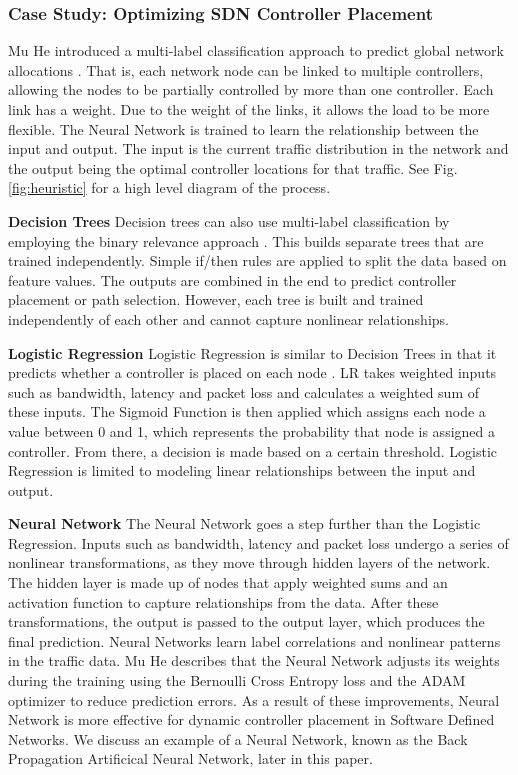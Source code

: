 \documentclass[conference]{IEEEtran}
\begin{document}
\subsubsection*{Case Study: Optimizing SDN Controller Placement}\label{AA}
Mu He introduced a multi-label classification approach to predict global network allocations \cite{He_Kalmbach_Blenk_Kellerer_Schmid_2017}. That is, each network node can be linked to multiple controllers, allowing the nodes to be partially controlled by more than one controller. Each link has a weight. Due to the weight of the links, it allows the load to be more flexible. The Neural Network is trained to learn the relationship between the input and output. The input is the current traffic distribution in the network and the output being the optimal controller locations for that traffic. See Fig. \ref{fig:heuristic} for a high level diagram of the process.

\textbf{Decision Trees}
Decision trees can also use multi-label classification by employing the binary relevance approach \cite{He_Kalmbach_Blenk_Kellerer_Schmid_2017}. This builds separate trees that are trained independently. Simple if/then rules are applied to split the data based on feature values. The outputs are combined in the end to predict controller placement or path selection. However, each tree is built and trained independently of each other and cannot capture nonlinear relationships.

\textbf{Logistic Regression}
Logistic Regression is similar to Decision Trees in that it predicts whether a controller is placed on each node \cite{He_Kalmbach_Blenk_Kellerer_Schmid_2017}. LR takes weighted inputs such as bandwidth, latency and packet loss and calculates a weighted sum of these inputs. The Sigmoid Function is then applied which assigns each node a value between 0 and 1, which represents the probability that node is assigned a controller. From there, a decision is made based on a certain threshold. Logistic Regression is limited to modeling linear relationships between the input and output.

\textbf{Neural Network}
The Neural Network goes a step further than the Logistic Regression. Inputs such as bandwidth, latency and packet loss undergo a series of nonlinear transformations, as they move through hidden layers of the network. The hidden layer is made up of nodes that apply weighted sums and an activation function to capture relationships from the data. After these transformations, the output is passed to the output layer, which produces the final prediction. Neural Networks learn label correlations and nonlinear patterns in the traffic data. Mu He describes that the Neural Network adjusts its weights during the training using the Bernoulli Cross Entropy loss and the ADAM optimizer to reduce prediction errors. As a result of these improvements, Neural Network is more effective for dynamic controller placement in Software Defined Networks. We discuss an example of a Neural Network, known as the Back Propagation Artificical Neural Network, later in this paper. 
\end{document}
